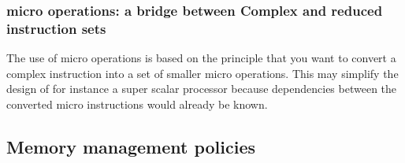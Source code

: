 \subsubsection{micro operations: a bridge between Complex and reduced instruction sets}
The use of micro operations is based on the principle that you want to convert a complex instruction into a set of smaller micro operations. This
may simplify the design of for instance a super scalar processor because dependencies between the converted micro instructions would already be known. 


\subsection{Memory management policies}

\section{}
